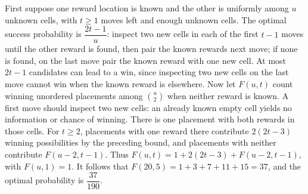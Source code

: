 First suppose one reward location is known and the other is uniformly among $u$ unknown cells, with $t\ge1$ moves left and enough unknown cells. The optimal success probability is $\dfrac{2t-1}{u}$: inspect two new cells in each of the first $t-1$ moves until the other reward is found, then pair the known rewards next move; if none is found, on the last move pair the known reward with one new cell. At most $2t-1$ candidates can lead to a win, since inspecting two new cells on the last move cannot win when the known reward is elsewhere. Now let $F(u,t)$ count winning unordered placements among $\binom u2$ when neither reward is known. A first move should inspect two new cells: an already known empty cell yields no information or chance of winning. There is one placement with both rewards in those cells. For $t\ge2$, placements with one reward there contribute $2(2t-3)$ winning possibilities by the preceding bound, and placements with neither contribute $F(u-2,t-1)$. Thus $F(u,t)=1+2(2t-3)+F(u-2,t-1)$, with $F(u,1)=1$. It follows that $F(20,5)=1+3+7+11+15=37$, and the optimal probability is $\boxed{\dfrac{37}{190}}$.
